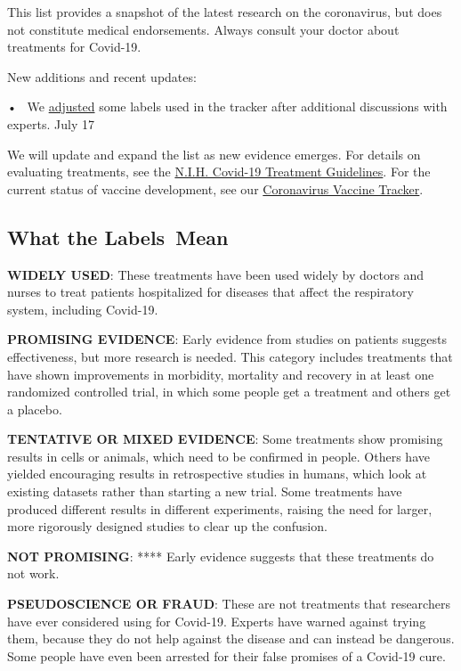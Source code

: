 This list provides a snapshot of the latest research on the coronavirus,
but does not constitute medical endorsements. Always consult your doctor
about treatments for Covid-19.

New additions and recent updates:

•~ We \protect\hyperlink{note}{adjusted} some labels used in the tracker
after additional discussions with experts. July 17

We will update and expand the list as new evidence emerges. For details
on evaluating treatments, see the
\href{https://www.covid19treatmentguidelines.nih.gov/}{N.I.H. Covid-19
Treatment Guidelines}. For the current status of vaccine development,
see our
\href{https://www.nytimes.com/interactive/2020/science/coronavirus-vaccine-tracker.html}{Coronavirus
Vaccine Tracker}.

\hypertarget{what-the-labels-mean}{%
\subsection{What the Labels~Mean}\label{what-the-labels-mean}}

\textbf{WIDELY USED}: These treatments have been used widely by doctors
and nurses to treat patients hospitalized for diseases that affect the
respiratory system, including Covid-19.

\textbf{PROMISING EVIDENCE}: Early evidence from studies on patients
suggests effectiveness, but more research is needed. This category
includes treatments that have shown improvements in morbidity, mortality
and recovery in at least one randomized controlled trial, in which some
people get a treatment and others get a placebo.

\textbf{TENTATIVE OR MIXED EVIDENCE}: Some treatments show promising
results in cells or animals, which need to be confirmed in people.
Others have yielded encouraging results in retrospective studies in
humans, which look at existing datasets rather than starting a new
trial. Some treatments have produced different results in different
experiments, raising the need for larger, more rigorously designed
studies to clear up the confusion.

\textbf{NOT PROMISING}: **** Early evidence suggests that these
treatments do not work.

\textbf{PSEUDOSCIENCE OR FRAUD}: These are not treatments that
researchers have ever considered using for Covid-19. Experts have warned
against trying them, because they do not help against the disease and
can instead be dangerous. Some people have even been arrested for their
false promises of a Covid-19 cure.

